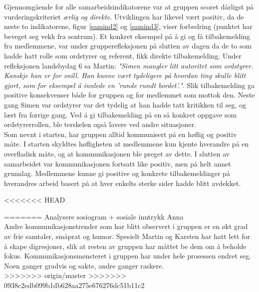 Gjennomgående for alle samarbeidsindikatorene var at gruppen scoret dårligst på vurderingskriteriet \textit{ærlig og direkte}. 
Utviklingen har likevel vært positiv, da de neste to indikatorene, figur \ref{samind2} og \ref{samind3}, viser forbedring (punktet har beveget seg vekk fra sentrum). 
Et konkret eksempel på å gi og få tilbakemelding fra medlemmene, var under grupperefleksjonen på slutten av dagen da de to som hadde hatt rolle som ordstyrer og referent, fikk direkte tilbakemelding. Under refleksjonen landsbydag 6 sa Martin: \textit{"Simen mangler litt autoritet som ordstyrer. Kanskje han er for snill. Han kunne vært tydeligere på hvordan ting skulle blitt gjort, som for eksempel å innlede en 'runde rundt bordet'."}. Slik tilbakemelding ga positive konsekvenser både for gruppen og for medlemmet som mottok den. Neste gang Simen var ordstyrer var det tydelig at han hadde tatt kritikken til seg, og lært fra forrige gang.
Ved å gi tilbakemelding på en så konkret oppgave som ordstyrerrollen, ble terskelen også lavere ved andre situasjoner. \\

Som nevnt i starten, har gruppen alltid kommunisert på en høflig og positiv måte. I starten skyldtes høfligheten at medlemmene kun kjente hverandre på en overfladisk måte, og at kommunikasjonen ble preget av dette. I slutten av samarbeidet var kommunikasjonen fortsatt like positiv, men på helt annet grunnlag. Medlemmene kunne gi positive og konkrete tilbakemeldinger på hverandres arbeid basert på at hver enkelts sterke sider hadde blitt avdekket. 






















<<<<<<< HEAD


=======
Analysere sosiogram + sosiale inntrykk Anna
\\
Andre kommunikasjonstrender som har blitt observert i gruppen er en økt grad av frie samtaler, småprat og humor. Spesielt Martin og Karsten har hatt lett for å skape digresjoner, slik at resten av gruppen har måttet be dem om å beholde fokus. 
Kommunikasjonsmønsteret i gruppen har under hele prosessen endret seg.
Noen ganger gradvis og sakte, andre ganger raskere. 
\\
>>>>>>> origin/master
>>>>>>> 0938c2edb099b1db628aa275e676276dc51b11c2
